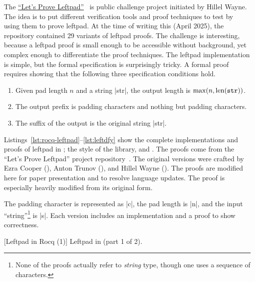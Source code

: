 The \href{https://github.com/hwayne/lets-prove-leftpad}{\enquote{Let's Prove
Leftpad}}~\cite{leftpad} is public challenge project initiated by Hillel Wayne.
The idea is to put different verification tools and proof techniques to test by
using them to prove leftpad. At the time of writing this (April 2025), the
repository contained 29 variants of leftpad proofs. The challenge is
interesting, because a leftpad proof is small enough to be accessible without
 background, yet complex enough to differentiate the proof
techniques. The leftpad implementation is simple, but the formal
specification is surprisingly tricky. A formal proof
requires showing that the following three specification conditions hold.

\begin{enumerate}
\item Given pad length \(n\) and a string \pr|str|, the output length is
\(\max(n, \text{len}(\prm{str}))\).
\item The output prefix is padding characters and nothing but padding
characters.
\item The suffix of the output is the original string \pr|str|.
\end{enumerate}

Listings~\autoref{lst:rocq-leftpad}--\ref{lst:leftdfy} show the complete
implementations and proofs of leftpad in ; the  style
of the  library, and . The proofs come
from the \enquote{Let's Prove Leftpad} project repository~\cite{leftpad}. The
original versions were crafted by Ezra Cooper (), Anton Trunov
(), and Hillel Wayne (). The proofs are modified here
for paper presentation and to resolve language updates. The  proof is
especially heavily modified from its original form.

The padding character is represented as \pr|c|, the pad length is \pr|n|, and
the input \enquote{string}\footnote{ None of the proofs actually refer to
\emph{string} type, though one uses a sequence of characters.} is \pr|s|. Each
version includes an implementation and a proof to show correctness.

\begin{center}
\captionsetup{type=lstlisting}
[Leftpad in Rocq (1)]
{Leftpad in  (part 1 of 2).}
\label{lst:rocq-leftpad}
\end{center}

